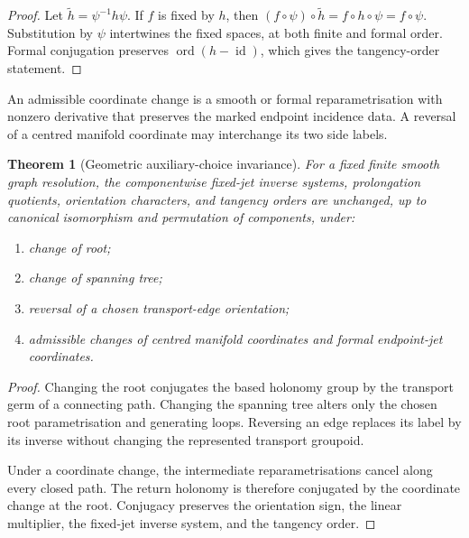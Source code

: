 \documentclass[11pt]{article}
\theoremstyle{plain}
\newtheorem{theorem}{Theorem}[section]
\theoremstyle{definition}
\begin{document}
\begin{proof}
Let
\(\widetilde h=\psi^{-1}h\psi\).
If \(f\) is fixed by \(h\), then
\((f\circ\psi)\circ\widetilde h = f\circ h\circ\psi = f\circ\psi\).
Substitution by \(\psi\) intertwines the fixed spaces, at both
finite and formal order. Formal conjugation preserves
\(\operatorname{ord} \left( h-\operatorname{id} \right)\),
which gives the tangency-order statement.
\end{proof}

An admissible coordinate change is a smooth or formal
reparametrisation with nonzero derivative that preserves the marked
endpoint incidence data. A reversal of a centred manifold coordinate
may interchange its two side labels.

\begin{theorem}[Geometric auxiliary-choice invariance]
\label{thm:geometric-holonomy-invariance}
For a fixed finite smooth graph resolution, the componentwise
fixed-jet inverse systems, prolongation quotients, orientation
characters, and tangency orders are unchanged, up to canonical
isomorphism and permutation of components, under:

\begin{enumerate}[label=\textup{(\roman*)}]
  \item change of root;

  \item change of spanning tree;

  \item reversal of a chosen transport-edge orientation;

  \item admissible changes of centred manifold coordinates and formal
        endpoint-jet coordinates.
\end{enumerate}
\end{theorem}

\begin{proof}
Changing the root conjugates the based holonomy group by the transport
germ of a connecting path. Changing the spanning tree alters only the
chosen root parametrisation and generating loops. Reversing an edge
replaces its label by its inverse without changing the represented
transport groupoid.

Under a coordinate change, the intermediate reparametrisations cancel
along every closed path. The return holonomy is therefore conjugated
by the coordinate change at the root. Conjugacy preserves the
orientation sign, the linear multiplier, the fixed-jet inverse system,
and the tangency order.
\end{proof}
\end{document}
